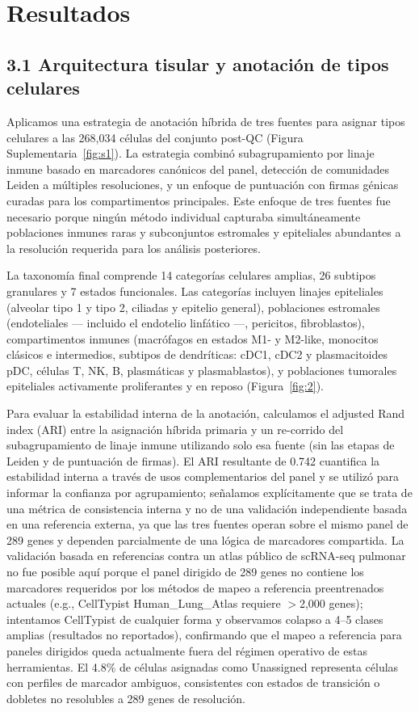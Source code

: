 \documentclass[12pt,a4paper]{article}
\begin{document}
\section*{Resultados}
\label{sec:results}

\subsection*{3.1 Arquitectura tisular y anotación de tipos celulares}
Aplicamos una estrategia de anotación híbrida de tres fuentes para asignar tipos celulares a las 268,034 células del conjunto post-QC (Figura Suplementaria~\ref{fig:s1}). La estrategia combinó subagrupamiento por linaje inmune basado en marcadores canónicos del panel, detección de comunidades Leiden a múltiples resoluciones, y un enfoque de puntuación con firmas génicas curadas para los compartimentos principales. Este enfoque de tres fuentes fue necesario porque ningún método individual capturaba simultáneamente poblaciones inmunes raras y subconjuntos estromales y epiteliales abundantes a la resolución requerida para los análisis posteriores.

La taxonomía final comprende 14 categorías celulares amplias, 26 subtipos granulares y 7 estados funcionales. Las categorías incluyen linajes epiteliales (alveolar tipo 1 y tipo 2, ciliadas y epitelio general), poblaciones estromales (endoteliales --- incluido el endotelio linfático ---, pericitos, fibroblastos), compartimentos inmunes (macrófagos en estados M1- y M2-like, monocitos clásicos e intermedios, subtipos de dendríticas: cDC1, cDC2 y plasmacitoides pDC, células T, NK, B, plasmáticas y plasmablastos), y poblaciones tumorales epiteliales activamente proliferantes y en reposo (Figura~\ref{fig:2}).

Para evaluar la estabilidad interna de la anotación, calculamos el adjusted Rand index (ARI) entre la asignación híbrida primaria y un re-corrido del subagrupamiento de linaje inmune utilizando solo esa fuente (sin las etapas de Leiden y de puntuación de firmas). El ARI resultante de 0.742 cuantifica la estabilidad interna a través de usos complementarios del panel y se utilizó para informar la confianza por agrupamiento; señalamos explícitamente que se trata de una métrica de consistencia interna y no de una validación independiente basada en una referencia externa, ya que las tres fuentes operan sobre el mismo panel de 289 genes y dependen parcialmente de una lógica de marcadores compartida. La validación basada en referencias contra un atlas público de scRNA-seq pulmonar no fue posible aquí porque el panel dirigido de 289 genes no contiene los marcadores requeridos por los métodos de mapeo a referencia preentrenados actuales (e.g., CellTypist Human\_Lung\_Atlas requiere $>$2,000 genes); intentamos CellTypist de cualquier forma y observamos colapso a 4--5 clases amplias (resultados no reportados), confirmando que el mapeo a referencia para paneles dirigidos queda actualmente fuera del régimen operativo de estas herramientas. El 4.8\% de células asignadas como Unassigned representa células con perfiles de marcador ambiguos, consistentes con estados de transición o dobletes no resolubles a 289 genes de resolución.
\end{document}
